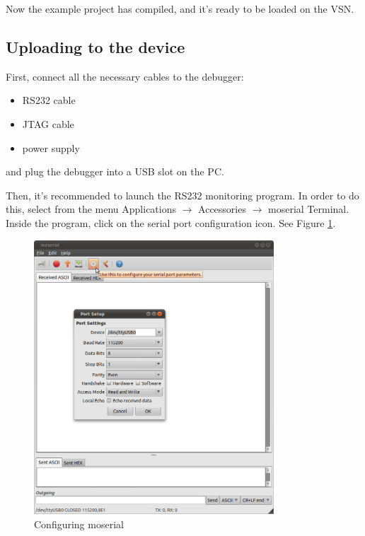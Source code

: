\documentclass[a4paper, 10pt]{article}
\begin{document}
Now the example project has compiled, and it's ready to be loaded on the VSN.

\subsection{Uploading to the device}

First, connect all the necessary cables to the debugger:
    \begin{itemize}
    \item RS232 cable
    \item JTAG cable
    \item power supply
    \end{itemize}
and plug the debugger into a USB slot on the PC.

Then, it's recommended to launch the RS232 monitoring program.
In order to do this, select from the menu
Applications $\rightarrow$ Accessories $\rightarrow$ moserial Terminal.
Inside the program, click on the serial port configuration icon.
See Figure \ref{fig:moserial-config}.

    \begin{figure}[H]
    \centering
        \includegraphics[width=0.8\textwidth]{./png-install-guide/moserial-config.png}
        \caption{Configuring moserial}
        \label{fig:moserial-config}
    \end{figure}
\end{document}
